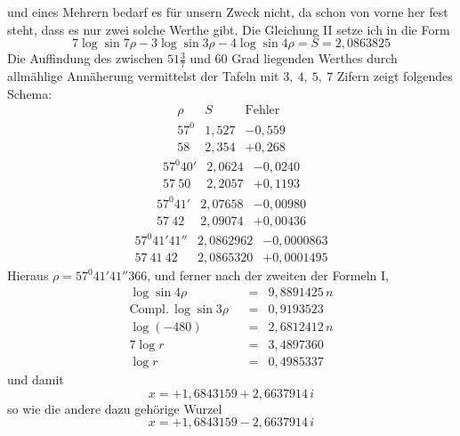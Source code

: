 und eines Mehrern bedarf es für unsern Zweck nicht, da schon von vorne her fest
steht, dass es nur zwei solche Werthe gibt. Die Gleichung II setze ich in die Form
\[
7\log\sin7\rho-3\log\sin3\rho-4\log\sin4\rho=S=2{,}0863825
\]
Die Auffindung des zwischen $51\frac37$ und $60$ Grad liegenden Werthes durch
allmählige Annäherung vermittelst der Tafeln mit $3,\ 4,\ 5,\ 7$ Zifern zeigt folgendes Schema:
\[
\begin{array}{c|c|c}
\rho&S&\text{Fehler}\\
57^{0}&1{,}527&-0{,}559\\
58&2{,}354&+0{,}268
\end{array}
\]
\[
\begin{array}{c|c|c}
57^{0}40'&2{,}0624&-0{,}0240\\
57\ 50&2{,}2057&+0{,}1193
\end{array}
\]
\[
\begin{array}{c|c|c}
57^{0}41'&2{,}07658&-0{,}00980\\
57\ 42&2{,}09074&+0{,}00436
\end{array}
\]
\[
\begin{array}{c|c|c}
57^{0}41'41''&2{,}0862962&-0{,}0000863\\
57\ 41\ 42&2{,}0865320&+0{,}0001495
\end{array}
\]
Hieraus $\rho=57^{0}41'41''366$, und ferner nach der zweiten der Formeln I,
\[
\begin{array}{lrcl}
\log\sin4\rho&&=&9{,}8891425\,n\\
\mathrm{Compl.}\,\log\sin3\rho&&=&0{,}9193523\\
\log(-480)&&=&2{,}6812412\,n\\\hline
7\log r&&=&3{,}4897360\\
\log r&&=&0{,}4985337
\end{array}
\]
und damit
\[
x=+1{,}6843159+2{,}6637914\,i
\]
so wie die andere dazu gehörige Wurzel
\[
x=+1{,}6843159-2{,}6637914\,i
\]

